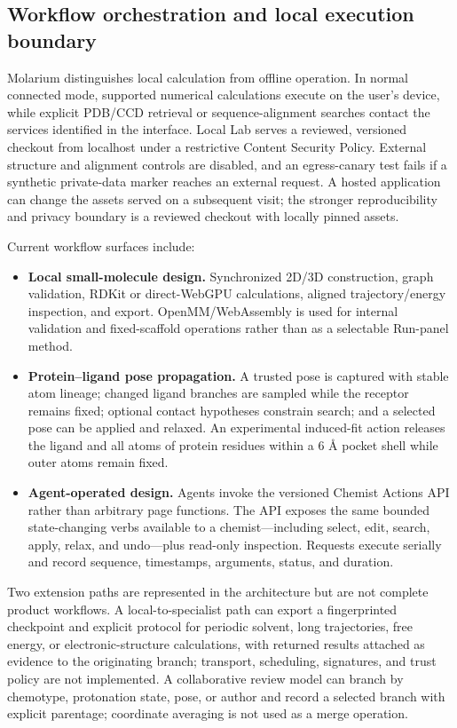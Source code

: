 \documentclass[11pt]{article}
\begin{document}
\begin{small}
\subsection{Workflow orchestration and local execution boundary}

Molarium distinguishes local calculation from offline operation. In normal connected mode, supported numerical calculations execute on the user's device, while explicit PDB/CCD retrieval or sequence-alignment searches contact the services identified in the interface. Local Lab serves a reviewed, versioned checkout from localhost under a restrictive Content Security Policy. External structure and alignment controls are disabled, and an egress-canary test fails if a synthetic private-data marker reaches an external request. A hosted application can change the assets served on a subsequent visit; the stronger reproducibility and privacy boundary is a reviewed checkout with locally pinned assets.

Current workflow surfaces include:

\begin{itemize}[leftmargin=*]
\item \textbf{Local small-molecule design.} Synchronized 2D/3D construction, graph validation, RDKit or direct-WebGPU calculations, aligned trajectory/energy inspection, and export. OpenMM/WebAssembly is used for internal validation and fixed-scaffold operations rather than as a selectable Run-panel method.
\item \textbf{Protein--ligand pose propagation.} A trusted pose is captured with stable atom lineage; changed ligand branches are sampled while the receptor remains fixed; optional contact hypotheses constrain search; and a selected pose can be applied and relaxed. An experimental induced-fit action releases the ligand and all atoms of protein residues within a 6 \AA{} pocket shell while outer atoms remain fixed.
\item \textbf{Agent-operated design.} Agents invoke the versioned Chemist Actions API rather than arbitrary page functions. The API exposes the same bounded state-changing verbs available to a chemist---including select, edit, search, apply, relax, and undo---plus read-only inspection. Requests execute serially and record sequence, timestamps, arguments, status, and duration.
\end{itemize}

Two extension paths are represented in the architecture but are not complete product workflows. A local-to-specialist path can export a fingerprinted checkpoint and explicit protocol for periodic solvent, long trajectories, free energy, or electronic-structure calculations, with returned results attached as evidence to the originating branch; transport, scheduling, signatures, and trust policy are not implemented. A collaborative review model can branch by chemotype, protonation state, pose, or author and record a selected branch with explicit parentage; coordinate averaging is not used as a merge operation.


\end{small}
\end{document}
